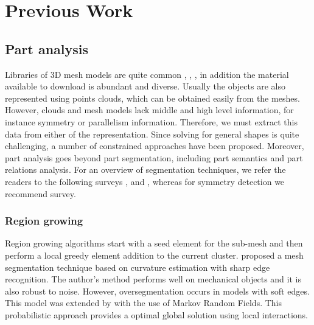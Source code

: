 \chapter{Previous Work}
\label{ch:prevWork}

\section{Part analysis}
\label{sec:partAnalysis}

Libraries of 3D mesh models are quite common \cite{Trimble2014}, \cite{GrabCAD2014}, \cite{Autodesk2014}, in addition the material available to download is abundant and diverse.   
Usually the objects are also represented using points clouds, which can be obtained easily from the meshes.
However, clouds and mesh models lack middle and high level information, for instance symmetry or parallelism information.
Therefore, we must extract this data from either of the representation.
Since solving for general shapes is quite challenging, a number of constrained approaches have been proposed.
Moreover, part analysis goes beyond part segmentation, including part semantics and part relations analysis. 
For an overview of segmentation techniques, we refer the readers to the following surveys \cite{Varady1997}, \cite{Agathos2007} and \cite{Shamir2008}, whereas for symmetry detection we recommend \cite{Mitra2013} survey.

\subsection{Region growing}

Region growing algorithms start with a seed element for the sub-mesh and then perform a local greedy element addition to the current cluster.
\cite{Mizoguchi2006} proposed a mesh segmentation technique based on curvature estimation with sharp edge recognition.
The author's method performs well on mechanical objects and it is also robust to noise.
However, oversegmentation occurs in models with soft edges.
This model was extended by \cite{Lavoue2008} with the use of Markov Random Fields.
This probabilistic approach provides a optimal global solution using local interactions.


